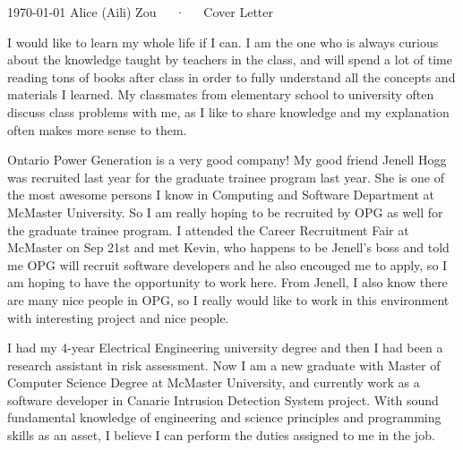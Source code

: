 \documentclass[11pt, a4paper]{awesome-cv}
\begin{document}
\makecvheader[R]

\makecvfooter
  {\today}
  {Alice (Aili) Zou~~~·~~~Cover Letter}
  {}

\makelettertitle

\begin{cvletter}

I would like to learn my whole life if I can. I am the one who is always curious about the knowledge taught by teachers in the class,
and will spend a lot of time reading tons of books after class in order to fully understand all the concepts and materials I learned.
My classmates from elementary school to university often discuss class problems with me, as I like to share knowledge and my
explanation often makes more sense to them.

Ontario Power Generation is a very good company! My good friend Jenell Hogg was recruited last year for the graduate trainee program last year. She is one of the most awesome persons I know in Computing and Software Department at McMaster University. So I am really hoping to be recruited by OPG as well for the graduate trainee program. I attended the Career Recruitment Fair at McMaster on Sep 21st and met Kevin, who happens to be Jenell's boss and told me OPG will recruit software developers and he also encouged me to apply, so I am hoping to have the opportunity to work here. From Jenell, I also know there are many nice people in OPG, so I really would like to work in this environment with interesting project and nice people.

I had my 4-year Electrical Engineering university degree and then I had been a research assistant in risk assessment. Now I am a new graduate with Master of Computer Science Degree at McMaster University, and currently work as a software developer in Canarie
Intrusion Detection System project. With sound fundamental knowledge of engineering and science principles and programming
skills as an asset, I believe I can perform the duties assigned to me in the job.
\end{cvletter}


\makeletterclosing
\end{document}
